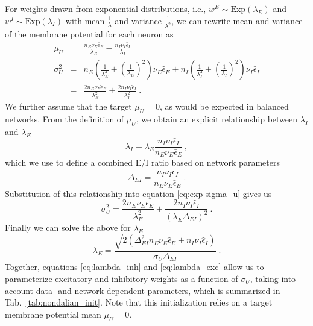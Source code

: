 \documentclass[11pt,a4paper]{article}
\begin{document}
For weights drawn from exponential distributions, i.e., $w^E \sim
\text{Exp}(\lambda_E)$ and $w^I \sim \text{Exp}(\lambda_I)$ with mean
$\frac{1}{\lambda}$ and variance $\frac{1}{\lambda^2}$, we can rewrite mean and variance of the membrane potential for each neuron as
\begin{eqnarray}
\mu_U &=& \frac{n_E\nu_E\bar\epsilon_E}{\lambda_E} -
\frac{n_I\nu_I\bar\epsilon_I}{\lambda_I}
\\
\sigma_U^2 &=& n_E
\left(\frac{1}{\lambda_E^2}+\left(\frac{1}{\lambda_E}\right)^2\right) \nu_E
\hat{\epsilon}_{E} +
n_I \left(\frac{1}{\lambda_I^2}+\left(\frac{1}{\lambda_I}\right)^2\right) \nu_I
\hat{\epsilon}_{I}
\nonumber
\\
&=& \frac{2 n_E\nu_E\hat\epsilon_E}{\lambda_E^2} + \frac{2
n_I\nu_I\hat\epsilon_I}{\lambda_I^2}  ~.
\label{eq:exp-sigma_u}
\end{eqnarray}
We further assume that the target $\mu_U = 0$, as would be expected in balanced
networks.
From the definition of $\mu_U$, we obtain an explicit
relationship between $\lambda_I$ and $\lambda_E$
\begin{equation} \label{eq:lambda_inh}
	\lambda_I = \lambda_E \frac{n_I \nu_I\bar\epsilon_I}{n_E\nu_E \bar\epsilon_E}~,
\end{equation}
which we use to define a combined E/I ratio based on network parameters
\begin{equation}
	\Delta_{EI} = \frac{n_I \nu_I \bar\epsilon_I}{n_E \nu_E \bar\epsilon_E}~.
	\label{eq:nd_delta_ei}
\end{equation}
Substitution of this relationship into equation \eqref{eq:exp-sigma_u} gives
us 
\begin{equation}
\sigma^2_U=\frac{2 n_E\nu_E\hat\epsilon_E}{\lambda_E^2} + \frac{2
n_I\nu_I\hat\epsilon_I}{(\lambda_E \Delta_{EI})^2}  ~.
\end{equation}
Finally we can solve the above for $\lambda_E$
\begin{equation}\label{eq:lambda_exc}
	\lambda_E = \frac{\sqrt{2(\Delta_{EI}^2 n_E\nu_E\hat\epsilon_E +
n_I\nu_I\hat\epsilon_I)}}{\sigma_U\Delta_{EI}} ~.
\end{equation}
Together, equations \eqref{eq:lambda_inh} and \eqref{eq:lambda_exc} allow us to
parameterize excitatory and inhibitory weights as a function of $\sigma_U$, taking
into account data- and network-dependent parameters, which is summarized in Tab.~\ref{tab:nondalian_init}.
Note that this initialization relies on a target membrane potential mean
$\mu_U = 0$.
\end{document}
